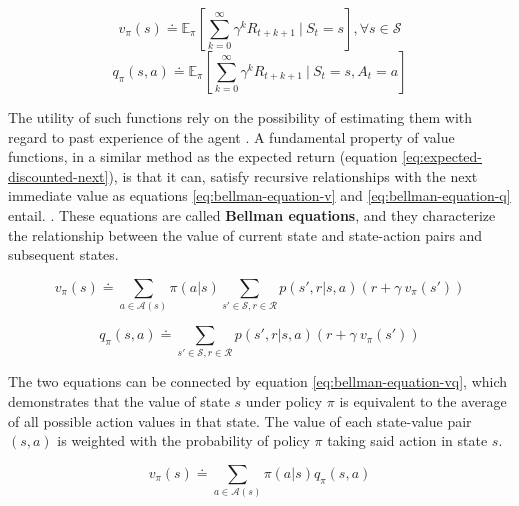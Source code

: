 \begin{equation} \label{eq:state-value-funtion}
	v_\pi(s) \doteq \mathbb{E}_\pi \left[ \sum^\infty_{k = 0} \gamma^k R_{t+k+1}\ \Bigg|\ S_t = s \right], \forall s \in \mathcal{S}
\end{equation}
\begin{equation} \label{eq:action-value-function}
	q_\pi(s,a) \doteq \mathbb{E}_\pi \left[ \sum^\infty_{k = 0} \gamma^k R_{t+k+1}\ \Bigg|\ S_t = s, A_t = a \right]    
\end{equation}

The utility of such functions rely on the possibility of estimating them with regard to past experience of the agent \cite{suttonReinforcementLearningIntroduction2014}. A fundamental property of value functions, in a similar method as the expected return (equation \ref{eq:expected-discounted-next}), is that it can, satisfy recursive relationships with the next immediate value as equations \ref{eq:bellman-equation-v}  and \ref{eq:bellman-equation-q} entail. \cite{suttonReinforcementLearningIntroduction2014}. These equations are called \textbf{Bellman equations}, and they characterize the relationship between the value of current state and state-action pairs and subsequent states. \par

\begin{equation} \label{eq:bellman-equation-v}
	v_\pi (s) \doteq \sum_{a \in \mathcal{A}(s)} \pi(a|s) \sum_{s' \in \mathcal{S}, r \in \mathcal{R}} p(s',r|s,a) (r + \gamma\ v_\pi (s'))
\end{equation}

\begin{equation} \label{eq:bellman-equation-q}
	q_\pi (s, a) \doteq \sum_{s' \in \mathcal{S}, r \in \mathcal{R}} p(s',r|s,a) (r + \gamma\ v_\pi (s'))
\end{equation}

The two equations can be connected by equation \ref{eq:bellman-equation-vq}, which demonstrates that the value of state $s$ under policy $\pi$ is equivalent to the average of all possible action values in that state. The value of each state-value pair $(s,a)$ is weighted with the probability of policy $\pi$ taking said action in state $s$.

\begin{equation} \label{eq:bellman-equation-vq}
	v_\pi (s) \doteq \sum_{a \in \mathcal{A}(s)} \pi(a|s) q_\pi (s,a)
\end{equation}



